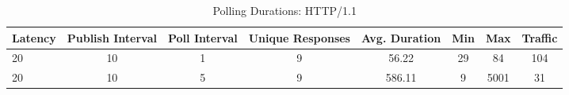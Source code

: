 
\begin{table}[H]
    \small\sffamily\centering\renewcommand{\arraystretch}{1.2}
    \caption{Polling Durations: HTTP/1.1}
    \label{undefined}

    
    \begin{tabular}{l|ccccccc}
        \hline
        \rowcolor{tableheadcolor}
         \bfseries Latency                                                    & \bfseries Publish Interval                                                                                                                                     & \bfseries Poll Interval                                                                                                          & \bfseries Unique Responses                                                                                                                                     & \bfseries Avg. Duration                                                                                                          & \bfseries Min                & \bfseries Max                & \bfseries Traffic                                                    \\
        \hline
 20                                                                   & 10                                                                                                                                                             & 1                                                                                                                                & 9                                                                                                                                                              & 56.22                                                                                                                            & 29                           & 84                           & 104                                                                  \\
 20                                                                   & 10                                                                                                                                                             & 5                                                                                                                                & 9                                                                                                                                                              & 586.11                                                                                                                           & 9                            & 5001                         & 31                                                                   \\

\end{tabular}
\end{table}
